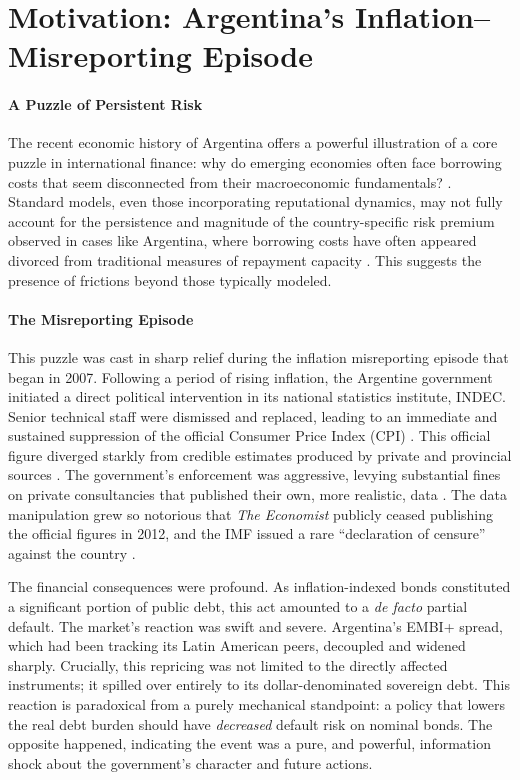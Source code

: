 \documentclass[12pt]{article}
\theoremstyle{plain}
\begin{document}
\section{Motivation: Argentina's Inflation--Misreporting Episode}
\label{sec:motivation}

\paragraph{A Puzzle of Persistent Risk}
The recent economic history of Argentina offers a powerful illustration of a
core puzzle in international finance: why do emerging economies often face
borrowing costs that seem disconnected from their macroeconomic fundamentals?
\citep{TomzWright2013, MeyerReinhartTrebesch2022}. Standard models, even those
incorporating reputational dynamics, may not fully account for the persistence
and magnitude of the country-specific risk premium observed in cases like
Argentina, where borrowing costs have often appeared divorced from traditional
measures of repayment capacity \citep{MorelliMoretti2023}. This suggests the
presence of frictions beyond those typically modeled.

\paragraph{The Misreporting Episode}
This puzzle was cast in sharp relief during the inflation misreporting episode
that began in 2007. Following a period of rising inflation, the Argentine
government initiated a direct political intervention in its national statistics
institute, INDEC. Senior technical staff were dismissed and replaced, leading
to an immediate and sustained suppression of the official Consumer Price Index
(CPI) \citep{MorelliMoretti2023}. This official figure diverged starkly from
credible estimates produced by private and provincial sources
\citep{Cavallo2013}. The government's enforcement was aggressive, levying
substantial fines on private consultancies that published their own, more
realistic, data \citep{ReutersFines2013}. The data manipulation grew so
notorious that \textit{The Economist} publicly ceased publishing the official
figures in 2012, and the IMF issued a rare ``declaration of censure'' against
the country \citep{Economist2012, IMFPress2013}.

The financial consequences were profound. As inflation-indexed bonds
constituted a significant portion of public debt, this act amounted to a
\textit{de facto} partial default. The market's reaction was swift and severe.
Argentina's EMBI+ spread, which had been tracking its Latin American peers,
decoupled and widened sharply. Crucially, this repricing was not limited to the
directly affected instruments; it spilled over entirely to its
dollar-denominated sovereign debt. This reaction is paradoxical from a purely
mechanical standpoint: a policy that lowers the real debt burden should have
\textit{decreased} default risk on nominal bonds. The opposite happened,
indicating the event was a pure, and powerful, information shock about the
government's character and future actions.
\end{document}
